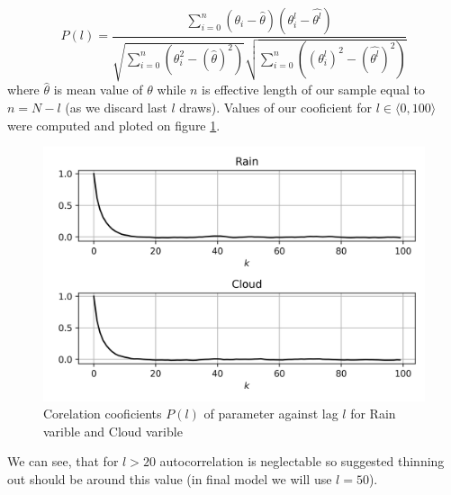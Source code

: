 \documentclass[12pt,a4paper]{article}
\begin{document}
\begin{equation*}
    P(l)=\frac{\sum_{i=0}^{n}(\theta_i-\hat{\theta})(\theta^l_i-\hat{\theta^l})}
    {\sqrt{\sum_{i=0}^n(\theta_i^2-(\hat{\theta})^2)}\sqrt{\sum_{i=0}^n((\theta_i^l)^2-(\hat{\theta^l})^2)}}
\end{equation*} where $\hat{\theta}$ is mean value of $\theta$ while $n$ is effective length of our sample equal to $n=N-l$ (as we discard last $l$ draws).
Values of our cooficient for $l\in \langle 0 , 100\rangle$ were computed and ploted on figure \ref{plot_6}.
\begin{figure}[H]
    \begin{center}
    \includegraphics{plot_6.png}
    \end{center}
    \caption{Corelation cooficients $P(l)$ of parameter against lag $l$ for Rain varible and Cloud varible}\label{plot_6}
\end{figure} We can see, that for $l>20$ autocorrelation is neglectable so suggested thinning out should be around this value (in final model we will use $l=50$).
\end{document}
